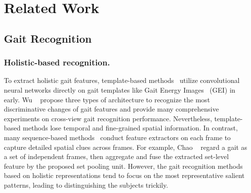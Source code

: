 \documentclass[runningheads]{llncs}
\begin{document}
    

    
\section{Related Work}

\subsection{Gait Recognition}
    
    \subsubsection{Holistic-based recognition.} To extract holistic gait features, template-based methods~\cite{shiraga2016geinet,wu2016comprehensive} utilize convolutional neural networks directly on gait templates like Gait Energy Images~\cite{han2005gei} (GEI) in early. Wu \etal~\cite{wu2016comprehensive} propose three types of architecture to recognize the most discriminative changes of gait features and provide many comprehensive experiments on cross-view gait recognition performance. Nevertheless, template-based methods lose temporal and fine-grained spatial information. In contrast, many sequence-based methods~\cite{aaai2019gaitset,gln,pami2020gaitnet} conduct feature extractors on each frame to capture detailed spatial clues across frames. For example, Chao \etal~\cite{aaai2019gaitset} regard a gait as a set of independent frames, then aggregate and fuse the extracted set-level feature by the proposed set pooling unit. However, the gait recognition methods based on holistic representations tend to focus on the most representative salient patterns, leading to distinguishing the subjects trickily.
    
\end{document}
